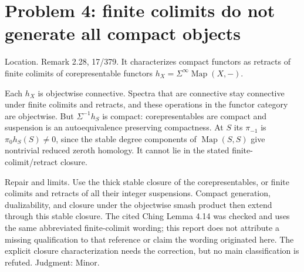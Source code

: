 \documentclass[10pt]{article}
\begin{document}
\section*{Problem 4: finite colimits do not generate all compact objects}
Location. Remark 2.28, 17/379. It characterizes compact functors as retracts of finite colimits of corepresentable functors \(h_X=\Sigma^\infty\operatorname{Map}(X,-)\).\par
Each \(h_X\) is objectwise connective. Spectra that are connective stay connective under finite colimits and retracts, and these operations in the functor category are objectwise. But \(\Sigma^{-1}h_S\) is compact: corepresentables are compact and suspension is an autoequivalence preserving compactness. At \(S\) its \(\pi_{-1}\) is \(\pi_0 h_S(S)\ne0\), since the stable degree components of \(\operatorname{Map}(S,S)\) give nontrivial reduced zeroth homology. It cannot lie in the stated finite-colimit/retract closure.\par
Repair and limits. Use the thick stable closure of the corepresentables, or finite colimits and retracts of all their integer suspensions. Compact generation, dualizability, and closure under the objectwise smash product then extend through this stable closure. The cited Ching Lemma 4.14 was checked and uses the same abbreviated finite-colimit wording; this report does not attribute a missing qualification to that reference or claim the wording originated here. The explicit closure characterization needs the correction, but no main classification is refuted. Judgment: Minor.\par
\end{document}
